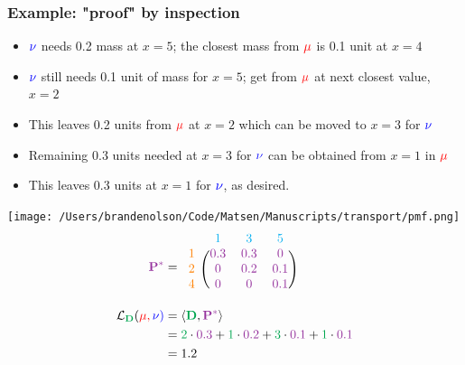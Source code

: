 \documentclass[mathserif,compress,xcolor={dvipsnames}]{beamer}
\newcommand*\ba{\[ \begin{aligned}}
\newcommand*\ea{\end{aligned} \]}
\renewcommand\;{\,}
\begin{document}
\begin{frame}\frametitle{Example: "proof" by inspection}
\begin{minipage}{0.49\linewidth}
\begin{itemize}
\item
${\color{blue} \nu}$ needs 0.2 mass at $x = 5$;  the closest mass from ${\color{red} \mu}$ is 0.1 unit at $x = 4$
\item
${\color{blue} \nu}$ still needs 0.1 unit of mass for $x = 5$; get from ${\color{red} \mu}$ at next closest value, $x = 2$
\item
This leaves 0.2 units from ${\color{red} \mu}$ at $x = 2$ which can be moved to $x = 3$ for ${\color{blue} \nu}$
\item
Remaining 0.3 units needed at $x = 3$ for ${\color{blue} \nu}$ can be obtained from $x = 1$ in ${\color{red} \mu}$
\item
This leaves 0.3 units at $x = 1$ for ${\color{blue} \nu}$, as desired.
\end{itemize}
\end{minipage}
\begin{minipage}{0.49\linewidth}
\texttt{[image: /Users/brandenolson/Code/Matsen/Manuscripts/transport/pmf.png]}
\footnotesize
\vspace{-1em}
\ba
{\color{Purple} \mathbf P^*} & = \begin{blockarray}{cccc}
	& {\color{ProcessBlue} 1} & {\color{ProcessBlue} 3} & {\color{ProcessBlue} 5} \\
	\begin{block}{c(ccc)}
		{\color{orange} 1} & \color{Purple} 0.3 & \color{Purple} 0.3 & \color{Purple} 0 \\
		{\color{orange} 2} & \color{Purple} 0 & \color{Purple}  0.2 & \color{Purple} 0.1 \\
		{\color{orange} 4} & \color{Purple} 0 & \color{Purple} 0 & \color{Purple} 0.1 \\
	\end{block}
\end{blockarray} \\
\mathcal L_{{\color{Green} \mathbf D}}(\color{red}\mu, \color{blue}\nu) 
	& = \langle \mathbf {\color{Green} D}, {\color{Purple} \mathbf P^*} \rangle \\
	& = {\color{Green} 2} \cdot {\color{Purple} 0.3} + {\color{Green} 1} \cdot {\color{Purple} 0.2} + {\color{Green} 3} \cdot {\color{Purple} 0.1} + {\color{Green} 1} \cdot {\color{Purple} 0.1} \\
	& = 1.2
\ea
\end{minipage}
\end{frame}
\end{document}
